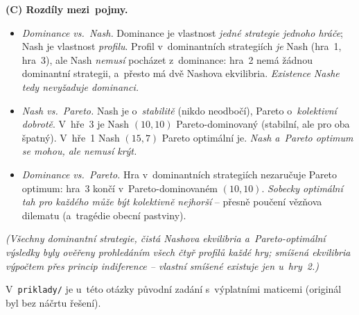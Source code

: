 \begin{priklad}
\medskip
\textbf{(C) Rozdíly mezi~pojmy.}
\begin{itemize}
  \item \emph{Dominance vs.\ Nash.} Dominance je vlastnost \emph{jedné strategie jednoho hráče}; Nash je vlastnost \emph{profilu}. Profil v~dominantních strategiích \emph{je} Nash (hra~1, hra~3), ale Nash \emph{nemusí} pocházet z~dominance: hra~2 nemá žádnou dominantní strategii, a~přesto má dvě Nashova ekvilibria. \emph{Existence Nashe tedy nevyžaduje dominanci.}
  \item \emph{Nash vs.\ Pareto.} Nash je o~\emph{stabilitě} (nikdo neodbočí), Pareto o~\emph{kolektivní dobrotě}. V~hře~3 je Nash $(10,10)$ Pareto-dominovaný (stabilní, ale pro oba špatný). V~hře~1 Nash $(15,7)$ Pareto optimální je. \emph{Nash a~Pareto optimum se mohou, ale nemusí krýt.}
  \item \emph{Dominance vs.\ Pareto.} Hra v~dominantních strategiích nezaručuje Pareto optimum: hra~3 končí v~Pareto-dominovaném $(10,10)$. \emph{Sobecky optimální tah pro každého může být kolektivně nejhorší} -- přesně poučení vězňova dilematu (a~tragédie obecní pastviny).
\end{itemize}
\emph{(Všechny dominantní strategie, čistá Nashova ekvilibria a~Pareto-optimální výsledky byly ověřeny prohledáním všech čtyř profilů každé hry; smíšená ekvilibria výpočtem přes princip indiference -- vlastní smíšené existuje jen u~hry~2.)}
\end{priklad}

\noindent V~\texttt{priklady/} je u~této otázky původní zadání s~výplatními maticemi (originál byl bez náčrtu řešení).
